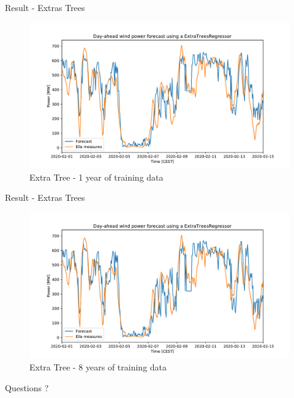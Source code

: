 \documentclass[12pt]{beamer}
\begin{document}
\begin{frame}{Result - Extras Trees}
    \begin{figure}
        \centering
        \includegraphics[width=\textwidth]{resources/pdf/xt_one_year.pdf}
        \caption{Extra Tree - 1 year of training data}
    \end{figure}
\end{frame}

\begin{frame}{Result - Extras Trees}
    \begin{figure}
        \centering
        \includegraphics[width=\textwidth]{resources/pdf/xt_8years.pdf}
        \caption{Extra Tree - 8 years of training data}
    \end{figure}
\end{frame}



\begin{frame}[standout]
  Questions ?
\end{frame}

\begin{frame}[allowframebreaks]
    \printbibliography
\end{frame}
\end{document}
